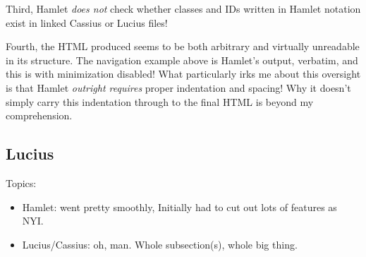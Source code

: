 Third, Hamlet \emph{does not} check whether classes and IDs written in Hamlet notation exist in linked Cassius or Lucius files!

Fourth, the HTML produced seems to be both arbitrary and virtually unreadable in its structure. The navigation example above is Hamlet's output, verbatim, and this is with minimization disabled! What particularly irks me about this oversight is that Hamlet \emph{outright requires} proper indentation and spacing! Why it doesn't simply carry this indentation through to the final HTML is beyond my comprehension.

\subsection{Lucius}
Topics:
\begin{itemize}
  \item Hamlet: went pretty smoothly, Initially had to cut out lots of features as NYI.
  \item Lucius/Cassius: oh, man. Whole subsection(s), whole big thing.
\end{itemize}

